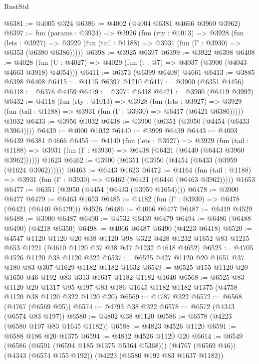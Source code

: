 \begin{lexlean}{RustStd}
\begin{coremodule}
@6381 := @4005 @324
@6386 := @4002 (@4004 @6381 @4666 @3960 @3962)
@6397 := fun (params : @3924) =>
  @3926
    (fun (rty : @1013) =>
    @3928
      (fun (lets : @3927) =>
      @3929 (fun (tail : @1188) => @3931 (fun (Γ : @3930) => @6353 (@6380 @6386)))))
@6398 := @3925 @6397
@6399 := @3922 @6398
@6408 := @4028 (fun (U : @4027) => @4029 (fun (t : @7) => @4037 (@3900 (@4043 @4663 @3918) @4054)))
@6411 := @6373 (@6399 @6408) @4661
@6413 := @3885 @6398 @6408
@6415 := @4115 @6397 @1210
@6417 := @3900 (@6351 @4456)
@6418 := @6376 @4459
@6419 := @3971 @6418
@6421 := @3900 (@6419 @3992)
@6432 := @4118
    (fun (rty : @1013) =>
    @3928
      (fun (lets : @3927) =>
      @3929 (fun (tail : @1188) => @3931 (fun (Γ : @3930) => @6417 (@6421 @6386)))))
    @1032
@6433 := @3956 @1032
@6438 := @3900 (@6351 (@3950 (@4454 (@6433 @3964))))
@6439 := @4000 @1032
@6440 := @3999 @6439
@6443 := @4003 @6439 @6381 @4666
@6455 := @4140
    (fun (lets : @3927) =>
    @3929
      (fun (tail : @1188) => @3931 (fun (Γ : @3930) => @6438 (@6421 (@6440 (@6443 @3960 @3962))))))
    @1623
@6462 := @3900 (@6351 (@3950 (@4454 (@6433 (@3959 (@1624 @3962))))))
@6463 := @6443 @1623
@6472 := @4164
    (fun (tail : @1188) => @3931 (fun (Γ : @3930) => @6462 (@6421 (@6440 (@6463 @3962)))))
    @1653
@6477 := @6351 (@3950 (@4454 (@6433 (@3959 @1654))))
@6478 := @3900 @6477
@6479 := @6463 @1653
@6485 := @4182 (fun (Γ : @3930) => @6478 (@6421 (@6440 @6479))) @4526
@6486 := @4066 @6477
@6487 := @6419 @4529
@6488 := @3900 @6487
@6490 := @4532 @6439 @6479
@6494 := @6486 (@6488 @6490) (@4218 @6350)
@6498 := @4066 @6487 @6490 (@4223 @6418)
@6520 := @4547
    @1120
    @1120
    @20
    @38
    @1120
    @98
    @322
    @428
    @1232
    @1652
    @83
    @1215
    @653
    @1221
    (@4610 @1120 @37 @38 @37 @1232 @4618 @4652)
@6525 := @4705 @4526 @1120 @38 @1120 @322
@6537 := @6525 @427 @1120 @20 @1651 @37 @180 @83 @307 @1629 @1182 @1182 @1632
@6549 := @6525 @155 @1120 @20 @1650 @46 @192 @83 @313 @1637 @1182 @1182 @1640
@6568 := @6525
    @83
    @1120
    @20
    @1317
    @95
    @197
    @83
    @186
    @1645
    @1182
    @1182
    @1375
    (@4758 @1120 @38 @1120 @322 @1120 @20)
@6569 := @4787 @322
@6572 := @6568 (@4767 (@6569 @95))
@6574 := @4793 @38 @322
@6578 := @6572 (@4343 (@6574 @83 @197))
@6580 := @4802 @38 @1120
@6586 := @6578 (@4223 (@6580 @197 @83 @1645 @1182))
@6588 := @4823 @4526 @1120
@6591 := @6588 @186 @20 @1375
@6594 := @4832 @4526 @1120 @20
@6614 := @6549
    (@6586 (@6591 (@6594 @185 @1375 @5364 @5368)))
    (@4767 (@6569 @46))
    (@4343 (@6574 @155 @192))
    (@4223 (@6580 @192 @83 @1637 @1182))

\end{coremodule}
\end{lexlean}
